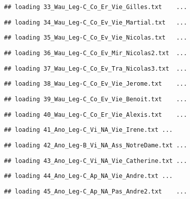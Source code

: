 \documentclass[]{article}
\begin{document}
\begin{verbatim}
## loading 33_Wau_Leg-C_Co_Er_Vie_Gilles.txt    ...
\end{verbatim}

\begin{verbatim}
## loading 34_Wau_Leg-C_Co_Ev_Vie_Martial.txt   ...
\end{verbatim}

\begin{verbatim}
## loading 35_Wau_Leg-C_Co_Ev_Vie_Nicolas.txt   ...
\end{verbatim}

\begin{verbatim}
## loading 36_Wau_Leg-C_Co_Ev_Mir_Nicolas2.txt  ...
\end{verbatim}

\begin{verbatim}
## loading 37_Wau_Leg-C_Co_Ev_Tra_Nicolas3.txt  ...
\end{verbatim}

\begin{verbatim}
## loading 38_Wau_Leg-C_Co_Ev_Vie_Jerome.txt    ...
\end{verbatim}

\begin{verbatim}
## loading 39_Wau_Leg-C_Co_Ev_Vie_Benoit.txt    ...
\end{verbatim}

\begin{verbatim}
## loading 40_Wau_Leg-C_Co_Er_Vie_Alexis.txt    ...
\end{verbatim}

\begin{verbatim}
## loading 41_Ano_Leg-C_Vi_NA_Vie_Irene.txt ...
\end{verbatim}

\begin{verbatim}
## loading 42_Ano_Leg-B_Vi_NA_Ass_NotreDame.txt ...
\end{verbatim}

\begin{verbatim}
## loading 43_Ano_Leg-C_Vi_NA_Vie_Catherine.txt ...
\end{verbatim}

\begin{verbatim}
## loading 44_Ano_Leg-C_Ap_NA_Vie_Andre.txt ...
\end{verbatim}

\begin{verbatim}
## loading 45_Ano_Leg-C_Ap_NA_Pas_Andre2.txt    ...
\end{verbatim}
\end{document}
